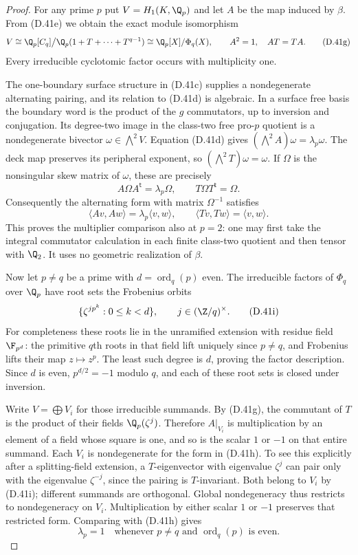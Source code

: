 \begin{proof}
For any prime $p$ put $V=H_1(K,\Q_p)$ and let $A$ be
the map induced by $\beta$.  From (D.41e) we obtain
the exact module isomorphism
\[
 V\cong
 \Q_p[C_q]\big/\Q_p(1+T+\cdots+T^{q-1})
 \cong\Q_p[X]/\Phi_q(X),\qquad
              A^2=1,\quad AT=TA.
                                                        \tag{D.41g}
\]
Every irreducible cyclotomic factor occurs with
multiplicity one.

The one-boundary surface structure in (D.41c) supplies
a nondegenerate alternating pairing, and its relation
to (D.41d) is algebraic.  In a surface free basis the
boundary word is the product of the $g$ commutators,
up to inversion and conjugation.  Its degree-two image
in the class-two free pro-$p$ quotient is a nondegenerate
bivector $\omega\in\bigwedge^2 V$.
Equation (D.41d) gives
$(\bigwedge^2 A)\omega=\lambda_p\omega$.
The deck map preserves its peripheral exponent, so
$(\bigwedge^2 T)\omega=\omega$.
If $\Omega$ is the nonsingular skew matrix of $\omega$,
these are precisely
\[
 A\Omega A^{\mathsf t}=\lambda_p\Omega,\qquad
 T\Omega T^{\mathsf t}=\Omega.
\]
Consequently the alternating form with matrix
$\Omega^{-1}$ satisfies
\[
 \langle Av,Aw\rangle=\lambda_p\langle v,w\rangle,
 \qquad
 \langle Tv,Tw\rangle=\langle v,w\rangle.
                                                        \tag{D.41h}
\]
This proves the multiplier comparison also at $p=2$:
one may first take the integral commutator calculation
in each finite class-two quotient and then tensor with
$\Q_2$.  It uses no geometric realization of $\beta$.

Now let $p\ne q$ be a prime with
$d=\operatorname{ord}_q(p)$ even.  The irreducible
factors of $\Phi_q$ over $\Q_p$ have root sets
the Frobenius orbits
\[
                  \{\zeta^{j p^k}:0\leq k<d\},
                     \qquad j\in(\Z/q)^\times.
                                                        \tag{D.41i}
\]
For completeness these roots lie in the unramified
extension with residue field $\F_{p^d}$: the primitive
$q$th roots in that field lift uniquely since $p\ne q$,
and Frobenius lifts their map $z\mapsto z^p$.
The least such degree is $d$, proving the factor
description.  Since $d$ is even, $p^{d/2}=-1$ modulo
$q$, and each of these root sets is closed under
inversion.

Write $V=\bigoplus V_i$ for those irreducible summands.
By (D.41g), the commutant of $T$ is the product of their
fields $\Q_p(\zeta^j)$.  Therefore $A|_{V_i}$ is
multiplication by an element of a field whose square
is one, and so is the scalar $1$ or $-1$ on that entire
summand.  Each $V_i$ is nondegenerate for the form in
(D.41h).  To see this explicitly after a splitting-field
extension, a $T$-eigenvector with eigenvalue $\zeta^j$
can pair only with the eigenvalue $\zeta^{-j}$, since
the pairing is $T$-invariant.  Both belong to $V_i$ by
(D.41i); different summands are orthogonal.  Global
nondegeneracy thus restricts to nondegeneracy on $V_i$.
Multiplication by either scalar $1$ or $-1$ preserves
that restricted form.  Comparing with (D.41h) gives
\[
 \lambda_p=1
       \quad\text{whenever }p\ne q
                    \text{ and }\operatorname{ord}_q(p)
                    \text{ is even}.
                                                        \tag{D.41j}
\]


\end{proof}
